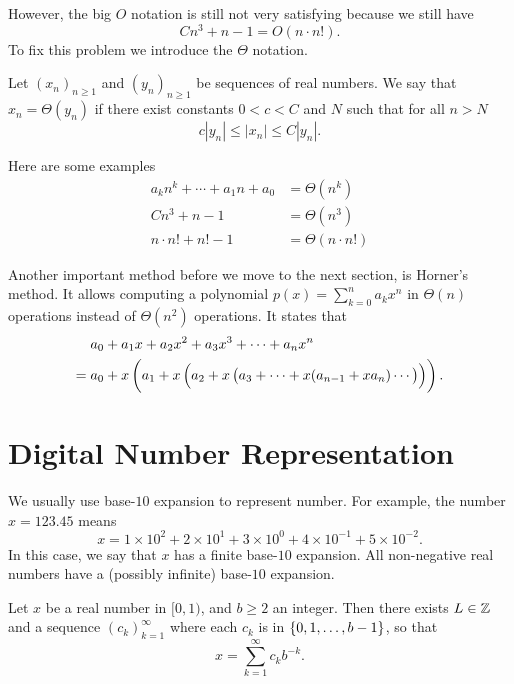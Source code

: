\documentclass[11pt,a4paper]{article}
\begin{document}
However, the big $O$ notation is still not very satisfying because
we still have
\[
  C n^3 + n - 1 = O(n \cdot n!).
\]
To fix this problem we introduce the $\Theta$ notation.

\begin{definition}
  Let $(x_n)_{n \geq 1}$ and $(y_n)_{n \geq 1}$ be sequences of real numbers.
  We say that $x_n = \Theta(y_n)$ if there exist constants $0 < c < C$ and $N$ 
  such that for all $n > N$
  \[
    c |y_n| \le |x_n| \le C |y_n|.
  \]
\end{definition}

Here are some examples
\begin{align*}
  a_k n^k + \cdots + a_1 n + a_0 &= \Theta(n^k) \\
  Cn^3 + n - 1 &= \Theta(n^3) \\
  n \cdot n! + n! - 1 &= \Theta(n \cdot n!)
\end{align*}

Another important method before we move to the next section,
is Horner's method.
It allows computing a polynomial $p(x) = \sum_{k=0}^{n} a_k x^n$ in
$\Theta(n)$ operations instead of $\Theta(n^2)$ operations.
It states that
\[
  \begin{aligned}
    &a_{0} + a_{1}x + a_{2}x^{2} + a_{3}x^{3} + \cdots + a_{n}x^{n} \\ = {}
    &a_{0} + x\del{a_{1} + x\del{a_{2} + x\del{a_{3} + \cdots + 
    x(a_{n-1} + x a_{n}) \cdots}}}.
  \end{aligned}
\]

\section{Digital Number Representation}
We usually use base-$10$ expansion to represent number.
For example, the number $x = 123.45$ means
\[
  x = 1 \times 10^2 + 2 \times 10^1 + 3 \times 10^0 + 4 \times 10^{-1} +
    5 \times 10^{-2}.
\]
In this case, we say that $x$ has a finite base-$10$ expansion.
All non-negative real numbers have a (possibly infinite) base-$10$ expansion.

\begin{theorem}
  \label{thm:bases}
  Let $x$ be a real number in $[0,1)$, and $b \geq 2$ an integer.
  Then there exists $L \in \mathbb{Z}$ and a sequence $(c_k)_{k=1}^{\infty}$ where
  each $c_k$ is in $\set{0,1,\dots,b-1}$, so that
  \[
    x = \sum_{k=1}^{\infty} c_k b^{-k}.
  \]
\end{theorem}
\end{document}

